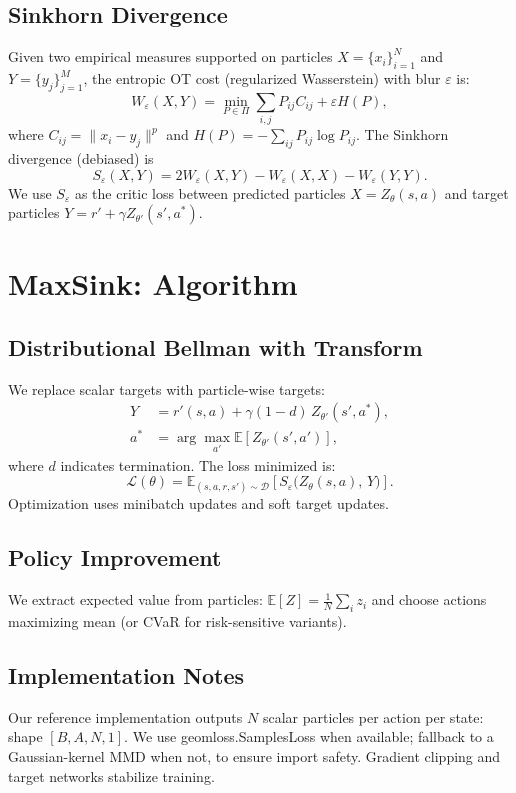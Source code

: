 \documentclass[10pt,twocolumn]{article}
\begin{document}
\subsection{Sinkhorn Divergence}
Given two empirical measures supported on particles $X=\{x_i\}_{i=1}^N$ and $Y=\{y_j\}_{j=1}^M$, the entropic OT cost (regularized Wasserstein) with blur $\varepsilon$ is:
\begin{equation}
W_\varepsilon(X,Y) = \min_{P\in\Pi}\sum_{i,j} P_{ij}C_{ij} + \varepsilon H(P),
\end{equation}
where $C_{ij}=\|x_i-y_j\|^p$ and $H(P)=-\sum_{ij}P_{ij}\log P_{ij}$. The Sinkhorn divergence (debiased) is
\begin{equation}
S_\varepsilon(X,Y) = 2W_\varepsilon(X,Y) - W_\varepsilon(X,X) - W_\varepsilon(Y,Y).
\label{eq:sinkhorn}
\end{equation}
We use $S_\varepsilon$ as the critic loss between predicted particles $X=Z_\theta(s,a)$ and target particles $Y=r' + \gamma Z_{\theta'}(s',a^*)$.

\section{MaxSink: Algorithm}
\subsection{Distributional Bellman with Transform}
We replace scalar targets with particle-wise targets:
\begin{align}
Y &= r'(s,a) + \gamma (1-d)\, Z_{\theta'}(s', a^*),\\
a^*&=\arg\max_{a'}\mathbb{E}[Z_{\theta'}(s',a')],
\end{align}
where $d$ indicates termination. The loss minimized is:
\begin{equation}
\mathcal{L}(\theta) = \mathbb{E}_{(s,a,r,s')\sim\mathcal{D}}\left[S_\varepsilon\big(Z_\theta(s,a),\,Y\big)\right].
\end{equation}
Optimization uses minibatch updates and soft target updates.

\subsection{Policy Improvement}
We extract expected value from particles: $\mathbb{E}[Z]=\frac{1}{N}\sum_i z_i$ and choose actions maximizing mean (or CVaR for risk-sensitive variants).

\subsection{Implementation Notes}
Our reference implementation outputs $N$ scalar particles per action per state: shape $[B,A,N,1]$. We use geomloss.SamplesLoss when available; fallback to a Gaussian-kernel MMD when not, to ensure import safety. Gradient clipping and target networks stabilize training.
\end{document}
